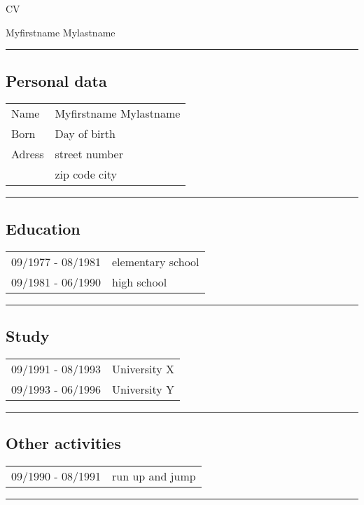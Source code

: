 \pagestyle{empty}


\begin{center}
{\sc \LARGE
CV
}

\medskip

\medskip

{\sc \Large
Myfirstname Mylastname
}

\end{center}

\bigskip
\rule{\textwidth}{0.1em}




\subsection*{\sc Personal data}
\begin{tabular}{lp{9cm}}
Name & Myfirstname Mylastname\\
Born &  Day of birth\\
Adress & street number \\
        & zip code city
\end{tabular}
\smallskip

\rule{\textwidth}{0.1em}



\subsection*{\sc Education}
\begin{tabular}{lp{9cm}}
09/1977 - 08/1981 &  elementary school\\
09/1981 - 06/1990 & high school\\
\end{tabular}

\smallskip
\rule{\textwidth}{0.1em}

\subsection*{\sc Study}
\begin{tabular}{lp{9cm}}
09/1991 - 08/1993 & University X \\
09/1993 - 06/1996 & University Y
\end{tabular}


\smallskip
\rule{\textwidth}{0.1em}


\subsection*{\sc Other activities}
\begin{tabular}{lp{9cm}}
09/1990 - 08/1991 & run up and jump
\end{tabular}


\smallskip
\rule{\textwidth}{0.1em}


